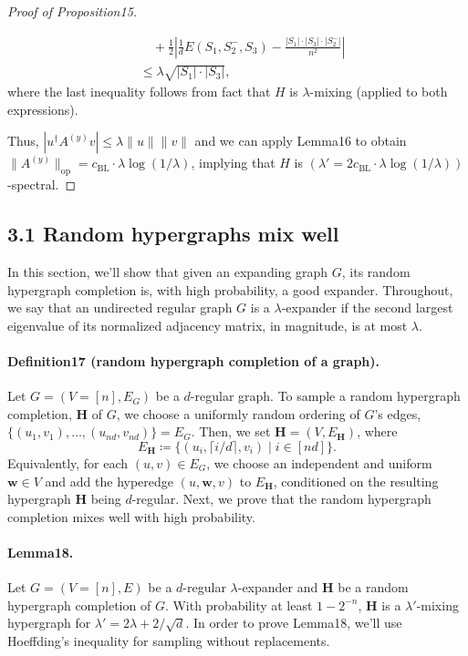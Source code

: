 \documentclass[10pt,a4paper]{article}
\begin{document}
\begin{proof}[Proof of Proposition15]
\begin{itemize}
\begin{align*}
&\quad+\frac12\left|\frac1dE(S_1,S_2^-,S_3)-\frac{|S_1|\cdot|S_3|\cdot|S_2^-|}{n^2}\right|\\
&\leq\lambda\sqrt{|S_1|\cdot|S_3|},
\end{align*}
where the last inequality follows from fact that $H$ is $\lambda$-mixing (applied to both expressions).
\end{itemize}
Thus, $|u^{\dagger}A^{(y)}v|\leq\lambda\|u\|\|v\|$ and we can apply Lemma16 to obtain $\|A^{(y)}\|_{\mathrm{op}}=c_{\mathrm{BL}}\cdot\lambda\log(1/\lambda)$, implying that $H$ is $(\lambda'=2c_{\mathrm{BL}}\cdot\lambda\log(1/\lambda))$-spectral.
\end{proof}

\subsection*{3.1 Random hypergraphs mix well}
In this section, we'll show that given an expanding graph $G$, its random hypergraph completion is, with high probability, a good expander. Throughout, we say that an undirected regular graph $G$ is a $\lambda$-expander if the second largest eigenvalue of its normalized adjacency matrix, in magnitude, is at most $\lambda$.
\paragraph{Definition17 (random hypergraph completion of a graph).} Let $G=(V=[n],E_G)$ be a $d$-regular graph. To sample a random hypergraph completion, $\mathbf H$ of $G$, we choose a uniformly random ordering of $G$'s edges, $\{(u_1,v_1),\ldots,(u_{nd},v_{nd})\}=E_G$. Then, we set $\mathbf H=(V,E_{\mathbf H})$, where
\[E_{\mathbf H}\coloneqq\{(u_i,\lceil i/d\rceil,v_i)\mid i\in[nd]\}.\]
Equivalently, for each $(u,v)\in E_G$, we choose an independent and uniform $\mathbf w\in V$ and add the hyperedge $(u,\mathbf w,v)$ to $E_{\mathbf H}$, conditioned on the resulting hypergraph $\mathbf H$ being $d$-regular.
Next, we prove that the random hypergraph completion mixes well with high probability.
\paragraph{Lemma18.} Let $G=(V=[n],E)$ be a $d$-regular $\lambda$-expander and $\mathbf H$ be a random hypergraph completion of $G$. With probability at least $1-2^{-n}$, $\mathbf H$ is a $\lambda'$-mixing hypergraph for $\lambda'=2\lambda+2/\sqrt d$.
In order to prove Lemma18, we'll use Hoeffding's inequality for sampling without replacements.
\end{document}
